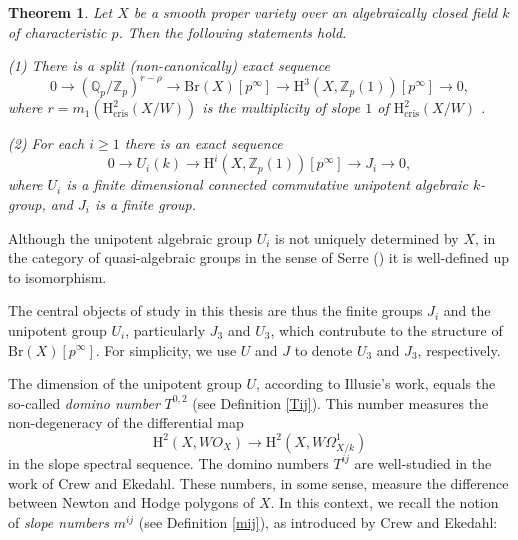 \documentclass[a4paper,12pt,twoside]{report}
\newtheorem*{theorem*}{Theorem}
\newcommand{\Q}{\mathbb{Q}}
\newcommand{\Z}{\mathbb{Z}}
\newcommand{\cris}{\mathrm{cris}}
\newcommand{\fppf}{\mathrm{fppf}}
\newcommand{\Br}{\mathrm{Br}}
\newcommand{\HH}{\mathrm{H}}
\begin{document}
\begin{theorem*}
    Let $X$ be a smooth proper variety over an algebraically closed field $k$ of characteristic $p$. 
    Then the following statements hold. 

{\rm (1)} There is a split (non-canonically) exact sequence 
    \begin{equation*}
        0\rightarrow (\Q_p/\Z_p)^{r-\rho} \rightarrow \Br(X)[p^{\infty}] 
        \rightarrow \HH^3(X,\Z_p(1))[p^{\infty}] \rightarrow 0,
    \end{equation*} 
    where $r=m_1(\HH^2_{\cris}(X/W))$ is the multiplicity of slope $1$ of $\HH^2_{\cris}(X/W)$%
.
    
{\rm (2)} For each $i\geqslant 1$ there is an exact sequence 
    \begin{equation*}
        0 \rightarrow U_i(k)\rightarrow \HH^i(X,\Z_p(1))[p^{\infty}] \rightarrow J_i \rightarrow 0,
    \end{equation*} 
    where $U_i$ is a finite dimensional connected commutative unipotent algebraic $k$-group, 
    and $J_i$ is a finite group.  
\end{theorem*}

Although the unipotent algebraic group $U_i$ is not uniquely determined by $X$, 
in the category of quasi-algebraic groups in the sense of Serre (\cite{Se})
it is well-defined up to isomorphism. %

The central objects of study in this thesis are thus the finite groups $J_i$ and the unipotent group $U_i$, 
particularly $J_3$ and $U_3$, which contrubute to the structure of $\Br(X)[p^\infty]$. 
For simplicity, we use $U$ and $J$ to denote $U_3$ and $J_3$, respectively. 

The dimension of 
the unipotent group $U$, according to Illusie's work, equals the so-called \emph{domino number} $T^{0,2}$ (see Definition \ref{Tij}). 
This number measures the non-degeneracy of the differential map 
\[\HH^2(X,WO_X)\rightarrow \HH^2(X,W\Omega^1_{X/k})\] 
in the slope spectral sequence. 
The domino numbers $T^{ij}$ are well-studied in the work of Crew and Ekedahl. 
These numbers, in some sense, measure the difference between Newton and Hodge polygons of $X$. 
In this context, we recall the notion of \emph{slope numbers} $m^{ij}$ (see Definition \ref{mij}), as introduced by Crew and Ekedahl: 
\end{document}
